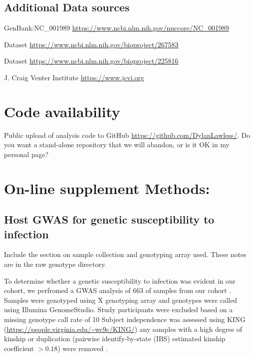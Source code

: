 \documentclass{article}
\begin{document}
\subsection{Additional Data sources}
\begin{description}[noitemsep]
\item GenBank:NC\_001989 \url{https://www.ncbi.nlm.nih.gov/nuccore/NC_001989}
\item Dataset \url{https://www.ncbi.nlm.nih.gov/bioproject/267583}
\item Dataset \url{https://www.ncbi.nlm.nih.gov/bioproject/225816}
\item J. Craig Venter Institute \url{https://www.jcvi.org}
\end{description}

\section{Code availability}
Public upload of analysis code to GitHub \url{https://github.com/DylanLawless/}.
Do you want a stand-alone repository that we will abandon, or is it OK in my personal page?

\section{On-line supplement Methods:}
\subsection{Host GWAS for genetic susceptibility to infection}

Include the section on sample collection and genotyping array used. 
These notes are in the raw genotype directory. 

To determine whether a genetic susceptibility to infection was evident in our cohort, 
we perfromed a GWAS analysis of 663 of samples from our cohort
\cite{lawless2020genome}.
Samples were genotyped using X genotyping array and genotypes were called using Illumina GenomeStudio. 
Study participants were excluded based on a missing genotype call rate of 10%
Subject independence was assessed using 
 KING (\url{https://people.virginia.edu/~wc9c/KING/})
any samples with a high degree of kinship or duplication 
(pairwise identify-by-state (IBS) estimated kinship coefficient $> 0.18$) were removed 
\cite{manichaikul_robust_2010}. 
\end{document}
